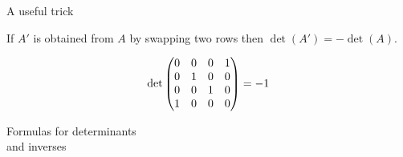 \documentclass{beamer}
\begin{document}
\begin{frame}
{A useful trick}
\begin{Lemma}
If \(A'\) is obtained from \(A\) by swapping two rows then
\(\det(A')=-\det(A)\).


\end{Lemma}
\begin{Example}
\[\det\begin{pmatrix} 0 & 0 & 0 & 1 \\ 0 & 1 & 0 & 0 \\ 0 & 0 & 1 & 0 \\ 1 & 0
& 0 & 0\end{pmatrix}=-1\]


\end{Example}
\end{frame}
\begin{frame}
\begin{center}
{\huge Formulas for determinants \\ and inverses}
\end{center}


\end{frame}
\end{document}
